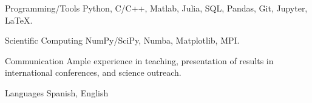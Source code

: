 

\begin{cvskills}

  \cvskill
    {Programming/Tools} %
    {Python, C/C++, Matlab, Julia, SQL, Pandas, Git, Jupyter, LaTeX.} %

  \cvskill
    {Scientific Computing} %
    {NumPy/SciPy, Numba, Matplotlib, MPI.} %

  \cvskill
    {Communication} %
    {Ample experience in teaching, presentation of results in international conferences, and science outreach.} %

  \cvskill
    {Languages} %
    {Spanish, English} %

\end{cvskills}
